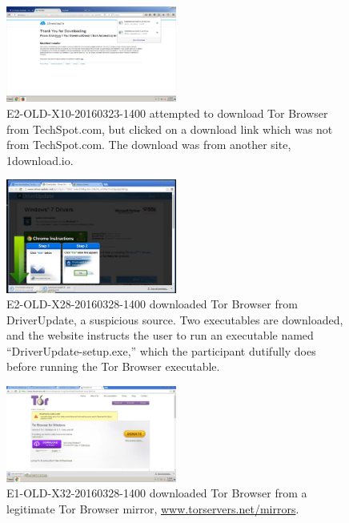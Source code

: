 \documentclass[USenglish,oneside,twocolumn]{article}
\begin{document}
\begin{figure}
\includegraphics[width=0.5\textwidth]{../experiment/processing/bad-participants/X10-20160323-132505-1downloadio.png}
\caption{E2-OLD-X10-20160323-1400 attempted to download Tor Browser from TechSpot.com, but clicked on
a download link which was not from TechSpot.com. The download was from another site, 1download.io.}
\label{downloadio}
\end{figure} 

\begin{figure}
\includegraphics[width=0.5\textwidth]{../experiment/processing/bad-participants/X28-20160328-134111-driverupdate.png}
\caption{E2-OLD-X28-20160328-1400 downloaded Tor Browser from DriverUpdate, a suspicious source. Two executables
are downloaded, and the website instructs the user to run an executable named ``DriverUpdate-setup.exe,'' which the
participant dutifully does before running the Tor Browser executable.}
\label{driverupdate}
\end{figure} 

\begin{figure}
\includegraphics[width=0.5\textwidth]{../experiment/processing/bad-participants/X32-20160328-134531-mirror.png}
\caption{E1-OLD-X32-20160328-1400 downloaded Tor Browser from a legitimate Tor Browser mirror, \url{www.torservers.net/mirrors}.}
\label{mirror}
\end{figure}
\end{document}
